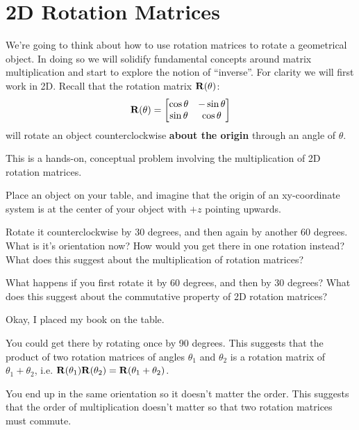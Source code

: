 
\section{2D Rotation Matrices}
We're going to think about how to use rotation matrices to rotate a geometrical object. In doing so we will solidify fundamental concepts around matrix multiplication and start to explore the notion of ``inverse''. For clarity we will first work in 2D. Recall that the rotation matrix $\mathbf{R}(\theta)$:
\[ \mathbf{R}(\theta) = \begin{bmatrix} \cos \theta & -\sin \theta \\ \sin \theta & \cos \theta\end{bmatrix} \]
will rotate an object counterclockwise \textbf{about the origin} through an angle of $\theta$.

\begin{prob}
This is a hands-on, conceptual problem involving the multiplication of 2D rotation matrices. 
\be
\item Place an object on your table, and imagine that the origin of an xy-coordinate system is at the center of your object with $+z$ pointing upwards. 
\item Rotate it counterclockwise by 30 degrees, and then again by another 60 degrees. What is it's orientation now? How would you get there in one rotation instead? What does this suggest about the multiplication of rotation matrices?
\item What happens if you first rotate it by 60 degrees, and then by 30 degrees? What does this suggest about the commutative property of 2D rotation matrices?
\ee
\end{prob}

\begin{sol}
\be
\item Okay, I placed my book on the table.
\item You could get there by rotating once by 90 degrees. This suggests that the product of two rotation matrices of angles $\theta_1$ and $\theta_2$ is a rotation matrix of $\theta_1+\theta_2$, i.e. $\mathbf{R}(\theta_1) \mathbf{R}(\theta_2) = \mathbf{R}(\theta_1+\theta_2)$.
\item You end up in the same orientation so it doesn't matter the order. This suggests that the order of multiplication doesn't matter so that two rotation matrices must commute.
\ee
\end{sol}

